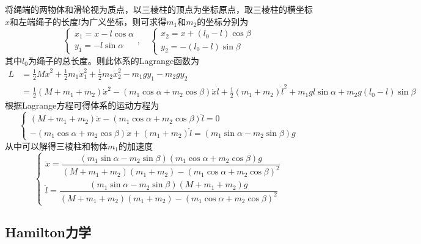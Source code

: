 \begin{solution}
将绳端的两物体和滑轮视为质点，以三棱柱的顶点为坐标原点，取三棱柱的横坐标$x$和左端绳子的长度$l$为广义坐标，则可求得$m_1$和$m_2$的坐标分别为
\begin{equation*}
\begin{cases}
	x_1 = x-l\cos \alpha \\
	y_1 = -l\sin \alpha
\end{cases},\quad 
\begin{cases}
	x_2 = x+(l_0-l)\cos \beta \\
	y_2 = -(l_0-l)\sin \beta
\end{cases}
\end{equation*}
其中$l_0$为绳子的总长度。则此体系的Lagrange函数为
\begin{align*}
	L & = \frac12 M\dot{x}^2 + \frac12 m_1\dot{x}_1^2 + \frac12 m_2\dot{x}_2^2 - m_1gy_1 - m_2gy_2 \\
	& = \frac12 (M+m_1+m_2) \dot{x}^2 - (m_1\cos\alpha+m_2\cos\beta)\dot{x}\dot{l} + \frac12 (m_1+m_2)\dot{l}^2 + m_1 gl\sin\alpha+m_2g(l_0-l)\sin\beta
\end{align*}
根据Lagrange方程可得体系的运动方程为
\begin{equation*}
\begin{cases}
	(M+m_1+m_2)\ddot{x} - (m_1\cos\alpha+m_2\cos\beta)\ddot{l} = 0 \\
	- (m_1\cos\alpha+m_2\cos\beta)\ddot{x}+(m_1+m_2)\ddot{l} = (m_1\sin\alpha-m_2\sin\beta)g
\end{cases}
\end{equation*}
从中可以解得三棱柱和物体$m_1$的加速度
\begin{equation*}
\begin{cases}
	\ddot{x} = \dfrac{(m_1\sin\alpha-m_2\sin\beta)(m_1\cos\alpha+m_2\cos\beta)g}{(M+m_1+m_2)(m_1+m_2)-(m_1\cos\alpha+m_2\cos\beta)^2} \\[1.5ex]
	\ddot{l} = \dfrac{(m_1\sin\alpha-m_2\sin\beta)(M+m_1+m_2)g}{(M+m_1+m_2)(m_1+m_2)-(m_1\cos\alpha+m_2\cos\beta)^2}
\end{cases}
\end{equation*}
\end{solution}

\subsection{Hamilton力学}

